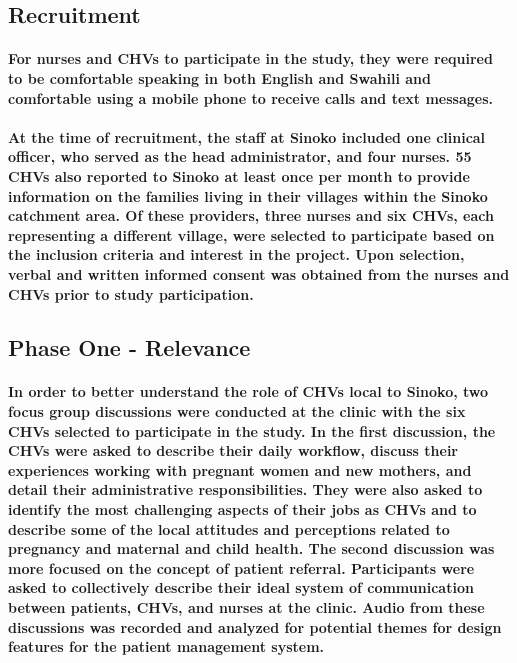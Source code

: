 \subsection{Recruitment}
\paragraph{For nurses and CHVs to participate in the study, they were required to be comfortable speaking in both English and Swahili and comfortable using a mobile phone to receive calls and text messages.}
\paragraph{At the time of recruitment, the staff at Sinoko included one clinical officer, who served as the head administrator, and four nurses. 55 CHVs also reported to Sinoko at least once per month to provide information on the families living in their villages within the Sinoko catchment area. Of these providers, three nurses and six CHVs, each representing a different village, were selected to participate based on the inclusion criteria and interest in the project. Upon selection, verbal and written informed consent was obtained from the nurses and CHVs prior to study participation.}

\subsection{Phase One - Relevance}
\paragraph{In order to better understand the role of CHVs local to Sinoko, two focus group discussions were conducted at the clinic with the six CHVs selected to participate in the study. In the first discussion, the CHVs were asked to describe their daily workflow, discuss their experiences working with pregnant women and new mothers, and detail their administrative responsibilities. They were also asked to identify the most challenging aspects of their jobs as CHVs and to describe some of the local attitudes and perceptions related to pregnancy and maternal and child health. The second discussion was more focused on the concept of patient referral. Participants were asked to collectively describe their ideal system of communication between patients, CHVs, and nurses at the clinic. Audio from these discussions was recorded and analyzed for potential themes for design features for the patient management system. }


